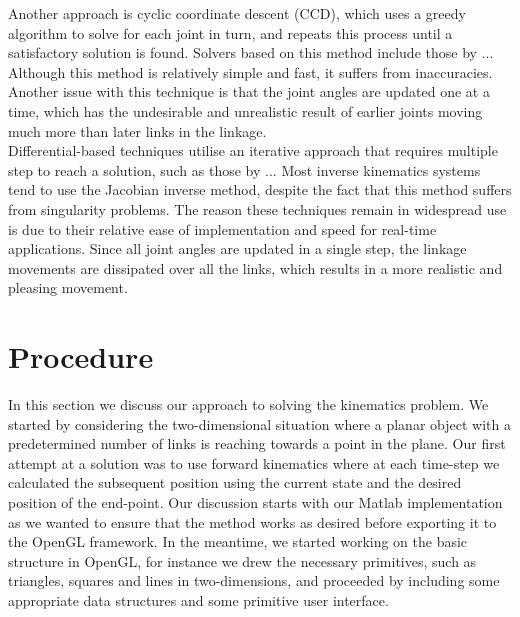 \documentclass[paper=a4, fontsize=11pt]{scrartcl} %
\numberwithin{equation}{section} %
\numberwithin{figure}{section} %
\numberwithin{table}{section} %
\begin{document}
Another approach is cyclic coordinate descent (CCD), which uses a greedy algorithm to solve for each joint in turn, and repeats this process until a satisfactory solution is found. Solvers based on this method include those by ... Although this method is relatively simple and fast, it suffers from inaccuracies. Another issue with this technique is that the joint angles are updated one at a time, which has the undesirable and unrealistic result of earlier joints moving much more than later links in the linkage. \\

Differential-based techniques utilise an iterative approach that requires multiple step to reach a solution, such as those by ... Most inverse kinematics systems tend to use the Jacobian inverse method, despite the fact that this method suffers from singularity problems. The reason these techniques remain in widespread use is due to their relative ease of implementation and speed for real-time applications. Since all joint angles are updated in a single step, the linkage movements are dissipated over all the links, which results in a more realistic and pleasing movement. \\




\section{Procedure}
In this section we discuss our approach to solving the kinematics problem. We started by considering the two-dimensional situation where a planar object with a predetermined number of links is reaching towards a point in the plane. Our first attempt at a solution was to use forward kinematics where at each time-step we calculated the subsequent position using the current state and the desired position of the end-point. Our discussion starts with our Matlab implementation as we wanted to ensure that the method works as desired before exporting it to the OpenGL framework. In the meantime, we started working on the basic structure in OpenGL, for instance we drew the necessary primitives, such as triangles, squares and lines in two-dimensions, and proceeded by including some appropriate data structures and some primitive user interface. \\
\end{document}

